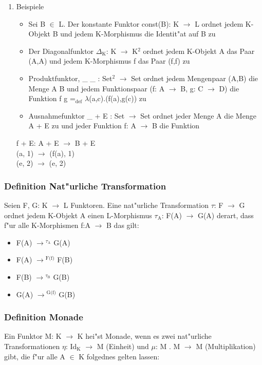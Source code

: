 \documentclass[11pt]{article}
\begin{document}
\begin{enumerate}
\item Beispiele
\label{sec-5-2-2-1}
\begin{itemize}
\item Sei B $\in$ L. Der konstante Funktor const(B): K $\to$ L ordnet jedem K-Objekt B und jedem K-Morphismus die Identit"at auf B zu
\item Der Diagonalfunktor $\Delta$$_{\text{K}}$: K $\to$ K$^{\text{2}}$ ordnet jedem K-Objekt A das Paar (A,A) und jedem K-Morphismus f das Paar (f,f) zu
\item Produktfunktor, \_ \texttimes{} \_ : Set$^{\text{2}}$ $\to$ Set ordnet jedem Mengenpaar (A,B) die Menge A \texttimes{} B und jedem Funktionspaar (f: A $\to$ B, g: C $\to$ D) die Funktion f \texttimes{} g =$_{\text{def}}$ $\lambda$(a,c).(f(a),g(c)) zu
\item Ausnahmefunktor \_ + E : Set $\to$ Set ordnet jeder Menge A die Menge A + E zu und jeder Funktion f: A $\to$ B die Funktion
\end{itemize}
\begin{center}
f + E: A + E $\to$ B + E \\
(a, 1) $\to$ (f(a), 1) \\
(e, 2) $\to$ (e, 2) \\
\end{center}
\end{enumerate}

\subsubsection{Definition Nat"urliche Transformation}
\label{sec-5-2-3}
Seien F, G: K $\to$ L Funktoren. Eine nat"urliche Transformation $\tau$: F $\to$ G ordnet jedem K-Objekt A einen L-Morphismus $\tau$$_{\text{A}}$: F(A) 
$\to$ G(A) derart, dass f"ur alle K-Morphismen f:A $\to$ B das gilt:

\begin{itemize}
\item F(A) $\to$$^{\tau_{\text{A}}}$ G(A)
\item F(A) $\to$$^{\text{F(f)}}$ F(B)
\item F(B) $\to$$^{\tau_{\text{B}}}$ G(B)
\item G(A) $\to$$^{\text{G(f)}}$ G(B)
\end{itemize}

\subsubsection{Definition Monade}
\label{sec-5-2-4}
Ein Funktor M: K $\to$ K hei"st Monade, wenn es zwei nat"urliche Transformationen $\eta$: Id$_{\text{K}}$ $\to$ M (Einheit) und $\mu$: M . M $\to$ M 
(Multiplikation) gibt, die f"ur alle A $\in$ K folgednes gelten lassen:
\end{document}
